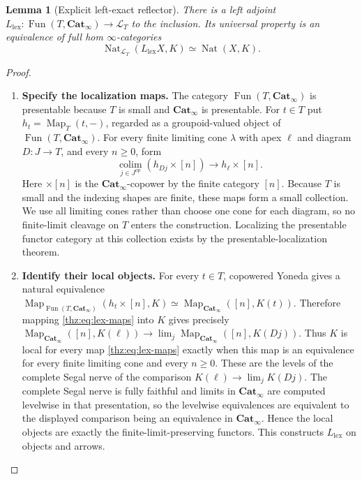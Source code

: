 \documentclass[oneside]{article}
\theoremstyle{plain}
\newtheorem{lemma}[theorem]{Lemma}
\theoremstyle{definition}
\theoremstyle{remark}
\newcommand{\Cat}{\mathbf{Cat}_{\infty}}
\newcommand{\Fun}{\operatorname{Fun}}
\newcommand{\Map}{\operatorname{Map}}
\newcommand{\Nat}{\operatorname{Nat}}
\newcommand{\op}{\mathrm{op}}
\begin{document}
\begin{lemma}[Explicit left-exact reflector]\label{thz:lem:lex-reflector}
There is a left adjoint $L_{\mathrm{lex}}:\Fun(T,\Cat) \longrightarrow\mathcal L_T$ to the inclusion.  Its universal property is an equivalence of full hom
$\infty$-categories
\begin{equation}\label{thz:eq:enriched-reflector}
 \Nat_{\mathcal L_T}(L_{\mathrm{lex}}X,K)
 \simeq\Nat(X,K).
\end{equation}
\end{lemma}
\begin{proof}
\leavevmode
\begin{enumerate}
\item \textbf{Specify the localization maps.} The category $\Fun(T,\Cat)$ is presentable because $T$ is small and
$\Cat$ is presentable.  For $t\in T$ put
$h_t=\Map_T(t,-)$, regarded as a groupoid-valued object of
$\Fun(T,\Cat)$.  For every finite limiting cone
$\lambda$ with apex $\ell$ and diagram $D:J\to T$, and every $n\geq0$,
form
\begin{equation}\label{thz:eq:lex-maps}
 \operatorname*{colim}_{j\in J^{\op}}
   (h_{Dj}\times[n])
 \longrightarrow h_\ell\times[n].
\end{equation}
Here $\times[n]$ is the $\Cat$-copower by the finite category $[n]$.
Because $T$ is small and the indexing shapes are finite, these maps form a
small collection.  We use all limiting cones rather than choose one cone for
each diagram, so no finite-limit cleavage on $T$ enters the construction.
Localizing the presentable functor category at this collection exists by the
presentable-localization theorem.\cite[\S5.5.4]{Lurie2009}
\item \textbf{Identify their local objects.} For every $t\in T$, copowered Yoneda gives a natural equivalence $\Map_{\Fun(T,\Cat)}(h_t\times[n],K) \simeq \Map_{\Cat}([n],K(t)).$ Therefore mapping \eqref{thz:eq:lex-maps} into $K$ gives precisely $\Map_{\Cat}([n],K(\ell)) \longrightarrow \lim_j\Map_{\Cat}([n],K(Dj)).$ Thus $K$ is local for every map \eqref{thz:eq:lex-maps} exactly when this
map is an equivalence for every finite limiting cone and every $n\geq0$.
These are the levels of the complete Segal nerve of the comparison $K(\ell)\longrightarrow\lim_jK(Dj).$ The complete Segal nerve is fully faithful and limits in $\Cat$ are
computed levelwise in that presentation, so the levelwise equivalences are
equivalent to the displayed comparison being an equivalence in
$\Cat$.  Hence the local objects are exactly the finite-limit-preserving
functors.  This constructs $L_{\mathrm{lex}}$ on objects and arrows.

\end{enumerate}
\end{proof}
\end{document}
